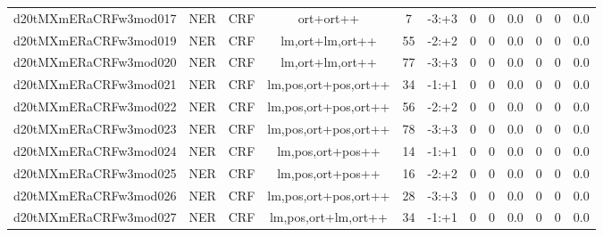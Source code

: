 \documentclass[a4paper]{article}
\begin{document}
\begin{landscape}
\begin{center}
\begin{tabular}{ |c|c|c|c|c|c|c|c|c|c|c|c|}
 
 	
 	\small{ d20tMXmERaCRFw3mod017 } & \small{ NER} & \small{  CRF }  & ort+ort++  &  7 &  \small{  -3:+3 }  &  0 & 0 & 0.0  &  0 & 0 & 0.0 \\
 	

 
 	
 	\small{ d20tMXmERaCRFw3mod019 } & \small{ NER} & \small{  CRF }  & lm,ort+lm,ort++  &  55 &  \small{  -2:+2 }  &  0 & 0 & 0.0  &  0 & 0 & 0.0 \\
 	

 
 	
 	\small{ d20tMXmERaCRFw3mod020 } & \small{ NER} & \small{  CRF }  & lm,ort+lm,ort++  &  77 &  \small{  -3:+3 }  &  0 & 0 & 0.0  &  0 & 0 & 0.0 \\
 	

 
 	
 	\small{ d20tMXmERaCRFw3mod021 } & \small{ NER} & \small{  CRF }  & lm,pos,ort+pos,ort++  &  34 &  \small{  -1:+1 }  &  0 & 0 & 0.0  &  0 & 0 & 0.0 \\
 	

 
 	
 	\small{ d20tMXmERaCRFw3mod022 } & \small{ NER} & \small{  CRF }  & lm,pos,ort+pos,ort++  &  56 &  \small{  -2:+2 }  &  0 & 0 & 0.0  &  0 & 0 & 0.0 \\
 	

 
 	
 	\small{ d20tMXmERaCRFw3mod023 } & \small{ NER} & \small{  CRF }  & lm,pos,ort+pos,ort++  &  78 &  \small{  -3:+3 }  &  0 & 0 & 0.0  &  0 & 0 & 0.0 \\
 	

 
 	
 	\small{ d20tMXmERaCRFw3mod024 } & \small{ NER} & \small{  CRF }  & lm,pos,ort+pos++  &  14 &  \small{  -1:+1 }  &  0 & 0 & 0.0  &  0 & 0 & 0.0 \\
 	

 
 	
 	\small{ d20tMXmERaCRFw3mod025 } & \small{ NER} & \small{  CRF }  & lm,pos,ort+pos++  &  16 &  \small{  -2:+2 }  &  0 & 0 & 0.0  &  0 & 0 & 0.0 \\
 	

 
 	
 	\small{ d20tMXmERaCRFw3mod026 } & \small{ NER} & \small{  CRF }  & lm,pos,ort+pos,ort++  &  28 &  \small{  -3:+3 }  &  0 & 0 & 0.0  &  0 & 0 & 0.0 \\
 	

 
 	
 	\small{ d20tMXmERaCRFw3mod027 } & \small{ NER} & \small{  CRF }  & lm,pos,ort+lm,ort++  &  34 &  \small{  -1:+1 }  &  0 & 0 & 0.0  &  0 & 0 & 0.0 \\
 	


\end{tabular}
\end{center}
\end{landscape}
\end{document}
